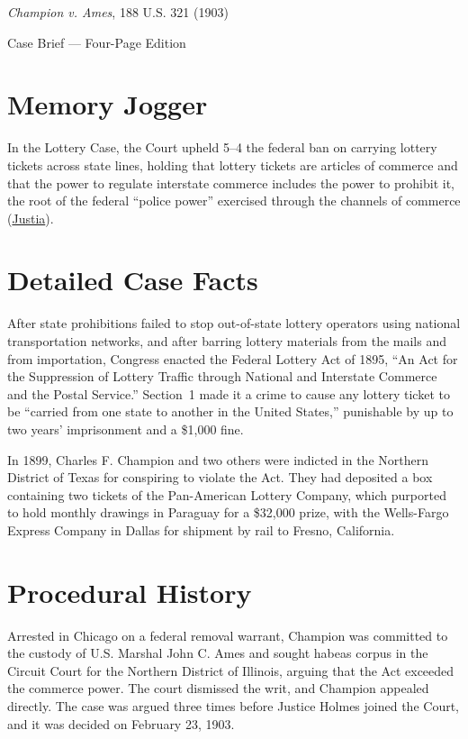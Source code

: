 \documentclass[12pt]{article}
\begin{document}
\begin{center}
{\LARGE \textit{Champion v. Ames}, 188 U.S. 321 (1903)\par}
\vspace{0.8em}
{\large Case Brief --- Four-Page Edition\par}
\end{center}
\vspace{1em}

\section{Memory Jogger}

In the Lottery Case, the Court upheld 5--4 the federal ban on carrying lottery tickets across state lines, holding that lottery tickets are articles of commerce and that the power to regulate interstate commerce includes the power to prohibit it, the root of the federal ``police power'' exercised through the channels of commerce (\href{https://supreme.justia.com/cases/federal/us/188/321/}{Justia}).

\section{Detailed Case Facts}

After state prohibitions failed to stop out-of-state lottery operators using national transportation networks, and after barring lottery materials from the mails and from importation, Congress enacted the Federal Lottery Act of 1895, ``An Act for the Suppression of Lottery Traffic through National and Interstate Commerce and the Postal Service.'' Section~1 made it a crime to cause any lottery ticket to be ``carried from one state to another in the United States,'' punishable by up to two years' imprisonment and a \$1,000 fine.

In 1899, Charles F. Champion and two others were indicted in the Northern District of Texas for conspiring to violate the Act. They had deposited a box containing two tickets of the Pan-American Lottery Company, which purported to hold monthly drawings in Paraguay for a \$32,000 prize, with the Wells-Fargo Express Company in Dallas for shipment by rail to Fresno, California.

\section{Procedural History}

Arrested in Chicago on a federal removal warrant, Champion was committed to the custody of U.S. Marshal John C. Ames and sought habeas corpus in the Circuit Court for the Northern District of Illinois, arguing that the Act exceeded the commerce power. The court dismissed the writ, and Champion appealed directly. The case was argued three times before Justice Holmes joined the Court, and it was decided on February 23, 1903.
\end{document}
